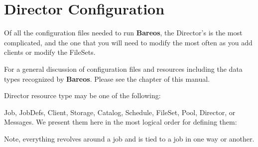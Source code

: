 
\chapter{Director Configuration}
\label{DirectorChapter}

Of all the configuration files needed to run {\bf Bareos}, the Director's is
the most complicated, and the one that you will need to modify the most often
as you add clients or modify the FileSets.

For a general discussion of configuration files and resources including the
data types recognized by {\bf Bareos}. Please see the
 chapter of this manual.


Director resource type may be one of the following:

Job, JobDefs, Client, Storage, Catalog, Schedule, FileSet, Pool, Director,  or
Messages. We present them here in the most logical order for defining them:

Note, everything revolves around a job and is tied to a job in one
way or another.

